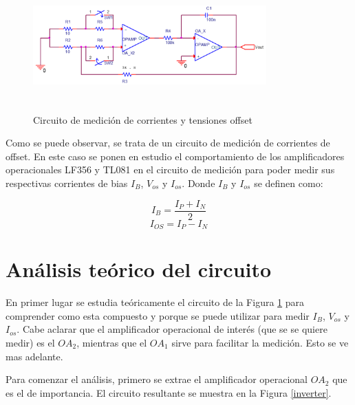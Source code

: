 \begin{figure}[ht]                                                       
    \centering\includegraphics[width=0.8\textwidth, height=5cm]{../Ex3/Figuras/circuito_medicion.png}
     \caption{Circuito de medición de corrientes y tensiones offset}
     \label{circuito_medicion}
     \end{figure}

     
Como se puede observar, se trata de un circuito de medición de corrientes de offset. En este caso se ponen en estudio el comportamiento de los
amplificadores operacionales LF356 y TL081 en el circuito de medición para poder medir sus respectivas corrientes de bias $I_B$, $V_{os}$ y $I_{os}$. Donde $I_B$ y $I_{os}$ se definen como:

\begin{equation} I_{B} = \frac{I_P+I_N}{2} \label{corriente_bias}\end{equation}
\begin{equation} I_{OS} = I_P - I_N \label{corriente_offset}\end{equation}

\section{Análisis teórico del circuito}


En primer lugar se estudia teóricamente el circuito de la Figura \ref{circuito_medicion} para comprender como esta compuesto y porque se puede utilizar para medir $I_B$, 
$V_{os}$  y $I_{os}$. Cabe aclarar que el amplificador operacional de interés (que se se quiere medir) es el $OA_2$, mientras que el $OA_1$ sirve para facilitar la medición. Esto se ve mas adelante.   

Para comenzar el análisis, primero se extrae el amplificador operacional $OA_2$ que es el de importancia. El circuito resultante se muestra en la Figura \ref{inverter}.

